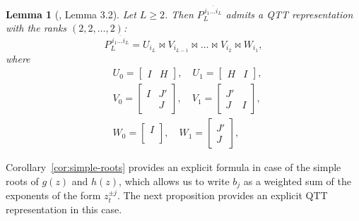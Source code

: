 \documentclass[a4paper]{article}
\newtheorem{lemma}{Lemma}[section]
\newcommand{\perm}{P}
\newcommand{\LL}{L}
\begin{document}
\begin{lemma}[\cite{kazeev2013multilevel}, Lemma 3.2] \label{lm:perm}
Let $\LL \geq 2$. Then $\perm_\LL^{\,\overline{i_1\dots i_\LL}}$ admits a QTT representation with the ranks $(2,2,\dots,2)$:
\[
    \perm_\LL^{\,\overline{i_1\dots i_\LL}} = U_{i_\LL} \Join V_{i_{\LL-1}} \Join \dots \Join V_{i_{2}} \Join W_{i_1},
\]
where
\[
\begin{split}
    &U_0 = 
    \begin{bmatrix}
        I & H
    \end{bmatrix},
    \quad
    U_1 = 
    \begin{bmatrix}
        H & I
    \end{bmatrix},
    \\
    &V_0 = 
    \begin{bmatrix}
        I & J' \\
         & J
    \end{bmatrix},
    \quad
    V_1 = 
    \begin{bmatrix}
        J' &  \\
        J  & I 
    \end{bmatrix},
    \\
    &W_0 = 
    \begin{bmatrix}
        I  \\ \\
    \end{bmatrix},
    \quad
    W_1 = 
    \begin{bmatrix}
        J' \\ J
    \end{bmatrix},
\end{split}
\]
\end{lemma}

Corollary~\ref{cor:simple-roots} provides an explicit formula in case of the simple roots of $g(z)$ and $h(z)$, which allows us to write $b_j$ as a weighted sum of the exponents of the form $z_t^{\pm j}$.
The next proposition provides an explicit QTT representation in this case.
\end{document}
